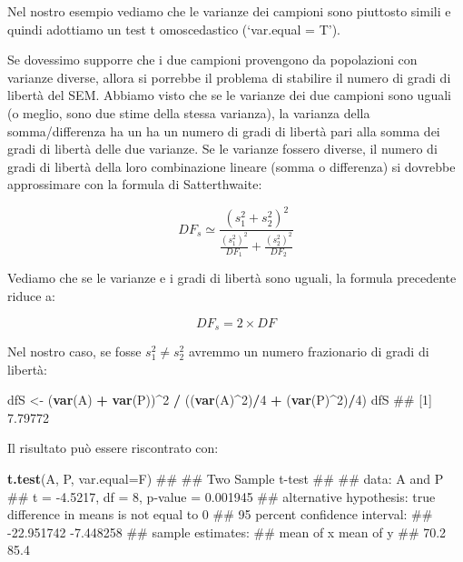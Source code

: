 \documentclass[a4paper,12pt,oneside]{book}
\newenvironment{Shaded}{\begin{snugshade}}{\end{snugshade}}
\newcommand{\KeywordTok}[1]{\textcolor[rgb]{0.13,0.29,0.53}{\textbf{#1}}}
\newcommand{\DataTypeTok}[1]{\textcolor[rgb]{0.13,0.29,0.53}{#1}}
\newcommand{\DecValTok}[1]{\textcolor[rgb]{0.00,0.00,0.81}{#1}}
\newcommand{\StringTok}[1]{\textcolor[rgb]{0.31,0.60,0.02}{#1}}
\newcommand{\OperatorTok}[1]{\textcolor[rgb]{0.81,0.36,0.00}{\textbf{#1}}}
\newcommand{\NormalTok}[1]{#1}
\theoremstyle{definition}
\theoremstyle{definition}
\theoremstyle{definition}
\theoremstyle{remark}
\begin{document}
Nel nostro esempio vediamo che le varianze dei campioni sono piuttosto
simili e quindi adottiamo un test t omoscedastico (`var.equal = T').

Se dovessimo supporre che i due campioni provengono da popolazioni con
varianze diverse, allora si porrebbe il problema di stabilire il numero
di gradi di libertà del SEM. Abbiamo visto che se le varianze dei due
campioni sono uguali (o meglio, sono due stime della stessa varianza),
la varianza della somma/differenza ha un ha un numero di gradi di
libertà pari alla somma dei gradi di libertà delle due varianze. Se le
varianze fossero diverse, il numero di gradi di libertà della loro
combinazione lineare (somma o differenza) si dovrebbe approssimare con
la formula di Satterthwaite:

\[DF_s \simeq \frac{ \left( s^2_1 + s^2_2 \right)^2 }{ \frac{(s^2_1)^2}{DF_1} + \frac{(s^2_2)^2}{DF_2} }\]

Vediamo che se le varianze e i gradi di libertà sono uguali, la formula
precedente riduce a:

\[DF_s = 2 \times DF\]

Nel nostro caso, se fosse \(s^2_1 \neq s^2_2\) avremmo un numero
frazionario di gradi di libertà:

\begin{Shaded}
\begin{Highlighting}[]
\NormalTok{dfS <-}\StringTok{ }\NormalTok{(}\KeywordTok{var}\NormalTok{(A) }\OperatorTok{+}\StringTok{ }\KeywordTok{var}\NormalTok{(P))}\OperatorTok{^}\DecValTok{2} \OperatorTok{/}\StringTok{ }
\StringTok{  }\NormalTok{((}\KeywordTok{var}\NormalTok{(A)}\OperatorTok{^}\DecValTok{2}\NormalTok{)}\OperatorTok{/}\DecValTok{4} \OperatorTok{+}\StringTok{ }\NormalTok{(}\KeywordTok{var}\NormalTok{(P)}\OperatorTok{^}\DecValTok{2}\NormalTok{)}\OperatorTok{/}\DecValTok{4}\NormalTok{)}
\NormalTok{dfS}
\NormalTok{## [1] 7.79772}
\end{Highlighting}
\end{Shaded}

Il risultato può essere riscontrato con:

\begin{Shaded}
\begin{Highlighting}[]
\KeywordTok{t.test}\NormalTok{(A, P, }\DataTypeTok{var.equal=}\NormalTok{F)}
\NormalTok{## }
\NormalTok{##  Two Sample t-test}
\NormalTok{## }
\NormalTok{## data:  A and P}
\NormalTok{## t = -4.5217, df = 8, p-value = 0.001945}
\NormalTok{## alternative hypothesis: true difference in means is not equal to 0}
\NormalTok{## 95 percent confidence interval:}
\NormalTok{##  -22.951742  -7.448258}
\NormalTok{## sample estimates:}
\NormalTok{## mean of x mean of y }
\NormalTok{##      70.2      85.4}
\end{Highlighting}
\end{Shaded}
\end{document}
